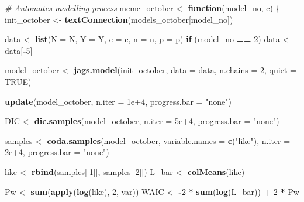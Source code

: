 \documentclass[
]{article}
\newenvironment{Shaded}{\begin{snugshade}}{\end{snugshade}}
\newcommand{\AttributeTok}[1]{\textcolor[rgb]{0.13,0.29,0.53}{#1}}
\newcommand{\CommentTok}[1]{\textcolor[rgb]{0.56,0.35,0.01}{\textit{#1}}}
\newcommand{\ConstantTok}[1]{\textcolor[rgb]{0.56,0.35,0.01}{#1}}
\newcommand{\ControlFlowTok}[1]{\textcolor[rgb]{0.13,0.29,0.53}{\textbf{#1}}}
\newcommand{\DecValTok}[1]{\textcolor[rgb]{0.00,0.00,0.81}{#1}}
\newcommand{\FloatTok}[1]{\textcolor[rgb]{0.00,0.00,0.81}{#1}}
\newcommand{\FunctionTok}[1]{\textcolor[rgb]{0.13,0.29,0.53}{\textbf{#1}}}
\newcommand{\NormalTok}[1]{#1}
\newcommand{\OtherTok}[1]{\textcolor[rgb]{0.56,0.35,0.01}{#1}}
\newcommand{\SpecialCharTok}[1]{\textcolor[rgb]{0.81,0.36,0.00}{\textbf{#1}}}
\newcommand{\StringTok}[1]{\textcolor[rgb]{0.31,0.60,0.02}{#1}}
\begin{document}
\begin{Shaded}
\begin{Highlighting}[]
\CommentTok{\# Automates modelling process}
\NormalTok{mcmc\_october }\OtherTok{\textless{}{-}} \ControlFlowTok{function}\NormalTok{(model\_no, c) \{}
\NormalTok{  init\_october }\OtherTok{\textless{}{-}} \FunctionTok{textConnection}\NormalTok{(models\_october[model\_no])}

\NormalTok{  data }\OtherTok{\textless{}{-}} \FunctionTok{list}\NormalTok{(}\AttributeTok{N =}\NormalTok{ N, }\AttributeTok{Y =}\NormalTok{ Y, }\AttributeTok{c =}\NormalTok{ c, }\AttributeTok{n =}\NormalTok{ n, }\AttributeTok{p =}\NormalTok{ p)}
  \ControlFlowTok{if}\NormalTok{ (model\_no }\SpecialCharTok{==} \DecValTok{2}\NormalTok{) data }\OtherTok{\textless{}{-}}\NormalTok{ data[}\SpecialCharTok{{-}}\DecValTok{5}\NormalTok{]}

\NormalTok{  model\_october }\OtherTok{\textless{}{-}} \FunctionTok{jags.model}\NormalTok{(init\_october, }\AttributeTok{data =}\NormalTok{ data, }
                              \AttributeTok{n.chains =} \DecValTok{2}\NormalTok{, }\AttributeTok{quiet =} \ConstantTok{TRUE}\NormalTok{)}

  \FunctionTok{update}\NormalTok{(model\_october, }\AttributeTok{n.iter =} \FloatTok{1e+4}\NormalTok{, }\AttributeTok{progress.bar =} \StringTok{"none"}\NormalTok{)}

\NormalTok{  DIC     }\OtherTok{\textless{}{-}} \FunctionTok{dic.samples}\NormalTok{(model\_october, }\AttributeTok{n.iter =} \FloatTok{5e+4}\NormalTok{, }\AttributeTok{progress.bar =} \StringTok{"none"}\NormalTok{)}
  
\NormalTok{  samples }\OtherTok{\textless{}{-}} \FunctionTok{coda.samples}\NormalTok{(model\_october, }\AttributeTok{variable.names =} \FunctionTok{c}\NormalTok{(}\StringTok{"like"}\NormalTok{),}
                          \AttributeTok{n.iter =} \FloatTok{2e+4}\NormalTok{, }\AttributeTok{progress.bar =} \StringTok{"none"}\NormalTok{)}
  
  
\NormalTok{  like  }\OtherTok{\textless{}{-}} \FunctionTok{rbind}\NormalTok{(samples[[}\DecValTok{1}\NormalTok{]], samples[[}\DecValTok{2}\NormalTok{]])}
\NormalTok{  L\_bar }\OtherTok{\textless{}{-}} \FunctionTok{colMeans}\NormalTok{(like)}

\NormalTok{  Pw }\OtherTok{\textless{}{-}} \FunctionTok{sum}\NormalTok{(}\FunctionTok{apply}\NormalTok{(}\FunctionTok{log}\NormalTok{(like), }\DecValTok{2}\NormalTok{, var))}
\NormalTok{  WAIC }\OtherTok{\textless{}{-}} \SpecialCharTok{{-}}\DecValTok{2} \SpecialCharTok{*} \FunctionTok{sum}\NormalTok{(}\FunctionTok{log}\NormalTok{(L\_bar)) }\SpecialCharTok{+} \DecValTok{2} \SpecialCharTok{*}\NormalTok{ Pw}
  

\end{Highlighting}
\end{Shaded}
\end{document}
